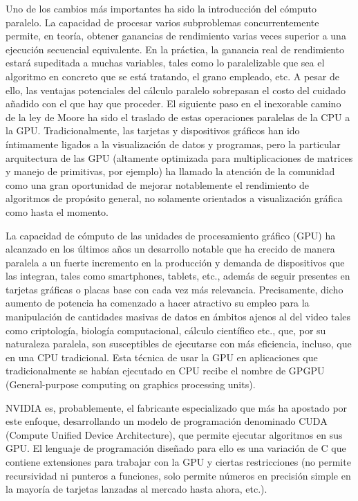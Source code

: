 \documentclass[twoside]{article}
\begin{document}
\vspace{5 mm}

Uno de los cambios más importantes ha sido la introducción del cómputo paralelo. La capacidad de procesar varios subproblemas concurrentemente permite, en teoría, obtener ganancias de rendimiento varias veces superior a una ejecución secuencial equivalente. En la práctica, la ganancia real de rendimiento estará supeditada a muchas variables, tales como lo paralelizable que sea el algoritmo en concreto que se está tratando, el grano empleado, etc. A pesar de ello, las ventajas potenciales del cálculo paralelo sobrepasan el costo del cuidado añadido con el que hay que proceder. El siguiente paso en el inexorable camino de la ley de Moore ha sido el traslado de estas operaciones paralelas de la CPU a la GPU. Tradicionalmente, las tarjetas y dispositivos gráficos han ido íntimamente ligados a la visualización de datos y programas, pero la particular arquitectura de las GPU (altamente optimizada para multiplicaciones de matrices y manejo de primitivas, por ejemplo) ha llamado la atención de la comunidad como una gran oportunidad de mejorar notablemente el rendimiento de algoritmos de propósito general, no solamente orientados a visualización gráfica como hasta el momento. 

\vspace{5 mm}

La capacidad de cómputo de las unidades de procesamiento gráfico (GPU) ha alcanzado en los últimos años un desarrollo notable que ha crecido de manera paralela a un fuerte incremento en la producción y demanda de dispositivos que las integran, tales como smartphones, tablets, etc., además de seguir presentes en tarjetas gráficas o placas base con cada vez más relevancia. Precisamente, dicho aumento de potencia ha comenzado a hacer atractivo su empleo para la manipulación de cantidades masivas de datos en ámbitos ajenos al del video tales como criptología, biología computacional, cálculo científico etc., que, por su naturaleza paralela, son susceptibles de ejecutarse con más eficiencia, incluso, que en una CPU tradicional. Esta técnica de usar la GPU en aplicaciones que tradicionalmente se habían ejecutado en CPU recibe el nombre de GPGPU (General-purpose computing on graphics processing units).

\vspace{5 mm}

NVIDIA \cite{DBLP:conf/csse/YangZP08} es, probablemente, el fabricante especializado que más ha apostado por este enfoque, desarrollando un modelo de programación denominado CUDA (Compute Unified Device Architecture), que permite ejecutar algoritmos en sus GPU. El lenguaje de programación diseñado para ello es una variación de C que contiene extensiones para trabajar con la GPU y ciertas restricciones (no permite recursividad ni punteros a funciones, solo permite números en precisión simple en la mayoría de tarjetas lanzadas al mercado hasta ahora, etc.).
\end{document}

